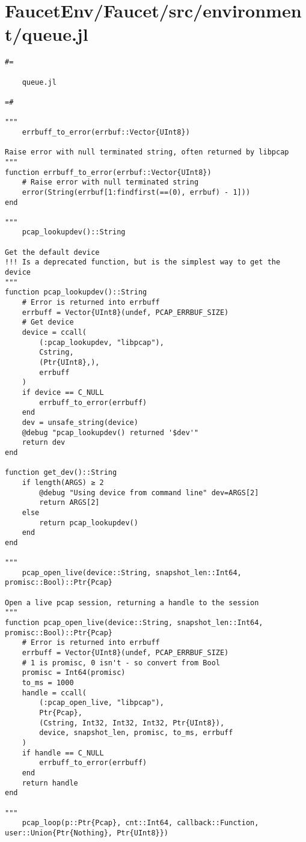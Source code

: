 \section{FaucetEnv/Faucet/src/environment/queue.jl}
\begin{lstlisting}[language=JuliaLocal, style=julia]
#=

    queue.jl

=#

"""
    errbuff_to_error(errbuf::Vector{UInt8})

Raise error with null terminated string, often returned by libpcap
"""
function errbuff_to_error(errbuf::Vector{UInt8})
    # Raise error with null terminated string
    error(String(errbuf[1:findfirst(==(0), errbuf) - 1]))
end 

"""
    pcap_lookupdev()::String

Get the default device
!!! Is a deprecated function, but is the simplest way to get the device
"""
function pcap_lookupdev()::String
    # Error is returned into errbuff
    errbuff = Vector{UInt8}(undef, PCAP_ERRBUF_SIZE)
    # Get device
    device = ccall(
        (:pcap_lookupdev, "libpcap"),
        Cstring,
        (Ptr{UInt8},),
        errbuff
    )
    if device == C_NULL
        errbuff_to_error(errbuff)
    end
    dev = unsafe_string(device)
    @debug "pcap_lookupdev() returned '$dev'"
    return dev
end

function get_dev()::String
    if length(ARGS) ≥ 2  
        @debug "Using device from command line" dev=ARGS[2]
        return ARGS[2]
    else
        return pcap_lookupdev()
    end
end

"""
    pcap_open_live(device::String, snapshot_len::Int64, promisc::Bool)::Ptr{Pcap}

Open a live pcap session, returning a handle to the session
"""
function pcap_open_live(device::String, snapshot_len::Int64, promisc::Bool)::Ptr{Pcap}
    # Error is returned into errbuff
    errbuff = Vector{UInt8}(undef, PCAP_ERRBUF_SIZE)
    # 1 is promisc, 0 isn't - so convert from Bool
    promisc = Int64(promisc)
    to_ms = 1000
    handle = ccall(
        (:pcap_open_live, "libpcap"),
        Ptr{Pcap},
        (Cstring, Int32, Int32, Int32, Ptr{UInt8}),
        device, snapshot_len, promisc, to_ms, errbuff
    )
    if handle == C_NULL
        errbuff_to_error(errbuff)
    end
    return handle
end

"""
    pcap_loop(p::Ptr{Pcap}, cnt::Int64, callback::Function, user::Union{Ptr{Nothing}, Ptr{UInt8}})


\end{lstlisting}
